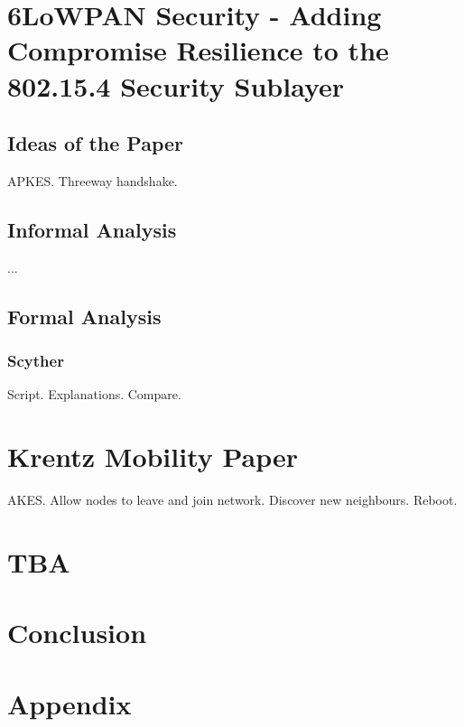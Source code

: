 \chapter{6LoWPAN Security - Adding Compromise Resilience to the 802.15.4 Security Sublayer}
\label{chp:krentz}


\section{Ideas of the Paper}

APKES. Threeway handshake.

\section{Informal Analysis}

...

\section{Formal Analysis}

\subsection{Scyther}


Script. Explanations. Compare.





\chapter{Krentz Mobility Paper}


AKES. Allow nodes to leave and join network. Discover new neighbours. Reboot.

\chapter{TBA}

\chapter{Conclusion}


\chapter{Appendix}